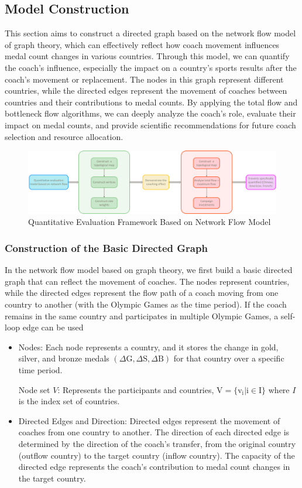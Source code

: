 \documentclass{mcmthesis}
\begin{document}
\subsection{Model Construction}
This section aims to construct a directed graph based on the network flow model of graph theory, which can effectively reflect how coach movement influences medal count changes in various countries. Through this model, we can quantify the coach’s influence, especially the impact on a country’s sports results after the coach's movement or replacement. The nodes in this graph represent different countries, while the directed edges represent the movement of coaches between countries and their contributions to medal counts. By applying the total flow and bottleneck flow algorithms, we can deeply analyze the coach's role, evaluate their impact on medal counts, and provide scientific recommendations for future coach selection and resource allocation.
\begin{figure}[h]   
    \centering          
    \includegraphics[width=12cm]{graph/graphy_baseline.png}
    \caption{Quantitative Evaluation Framework Based on Network Flow Model } \label{fig1}    
\end{figure}

\subsubsection{Construction of the Basic Directed Graph}
In the network flow model based on graph theory, we first build a basic directed graph that can reflect the movement of coaches. The nodes represent countries, while the directed edges represent the flow path of a coach moving from one country to another (with the Olympic Games as the time period). If the coach remains in the same country and participates in multiple Olympic Games, a self-loop edge can be used
\begin{itemize}
    \item Nodes: Each node represents a country, and it stores the change in gold, silver, and bronze medals $(\Delta\mathrm{G},\Delta\mathrm{S},\Delta\mathrm{B})$ for that country over a specific time period.
   
    Node set $V$: Represents the participants and countries, $\mathrm{V=\{v_i|i\in I\}}$ where $I$ is the index set of countries.
\item 	Directed Edges and Direction: Directed edges represent the movement of coaches from one country to another. The direction of each directed edge is determined by the direction of the coach's transfer, from the original country (outflow country) to the target country (inflow country). The capacity of the directed edge represents the coach's contribution to medal count changes in the target country.
\end{itemize}
\end{document}
